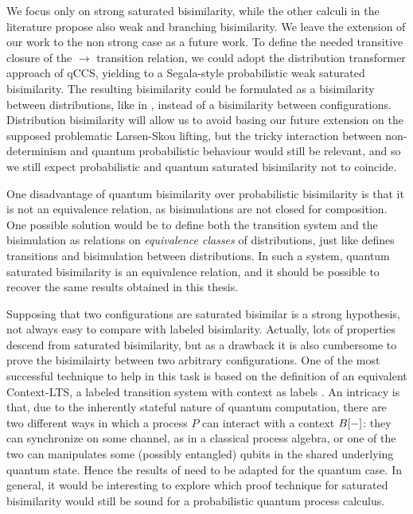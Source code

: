 We focus only on strong saturated bisimilarity, while the other calculi in the literature propose also weak and branching bisimilarity. We leave the extension of our work to the non strong case as a future work. To define the needed transitive closure of the $\rightarrow$ transition relation, we could adopt the distribution transformer approach of qCCS, yielding to a Segala-style probabilistic weak saturated bisimilarity. The resulting bisimilarity could be formulated as a bisimilarity between distributions, like in \cite{hennessyExploringProbabilisticBisimulations2012}, instead of a bisimilarity between configurations. Distribution bisimilarity will allow us to avoid basing our future extension on the supposed
problematic Larsen-Skou lifting, but the tricky interaction between non-determinism and quantum probabilistic behaviour would still be relevant, and so we still expect probabilistic and quantum saturated bisimilarity not to coincide.

One disadvantage of quantum bisimilarity over probabilistic bisimilarity is that it is not an equivalence relation, as bisimulations are not closed for composition. One possible solution would be to define both the transition system and the bisimulation as relations on \textit{equivalence classes} of distributions, just like \cite{hennessyExploringProbabilisticBisimulations2012} defines transitions and bisimulation between distributions. In such a system, quantum saturated bisimilarity is an equivalence relation, and it should be possible to recover the same results obtained in this thesis.

Supposing that two configurations are saturated bisimilar is a strong hypothesis, not always easy to compare with labeled bisimlarity. Actually, lots of properties descend from saturated bisimilarity, but as a drawback it is also cumbersome to prove the bisimilairty between two arbitrary configurations. One of the most successful technique to help in this task is based on the definition of an equivalent Context-LTS, a labeled transition system with context as labels \cite{bonchiGeneralTheoryBarbs2014}. An intricacy is that, due to the inherently stateful nature of quantum computation, there are two different ways in which a process $P$ can interact with a context $B[{-}]$: they can synchronize on some channel, as in a classical process algebra, or one of the two can manipulates some (possibly entangled) qubits in the shared  underlying quantum state. Hence the results of \cite{bonchiGeneralTheoryBarbs2014} need to be adapted for the quantum case. In general, it would be interesting to explore which proof technique for saturated bisimilarity would still be sound for a probabilistic quantum process calculus.
